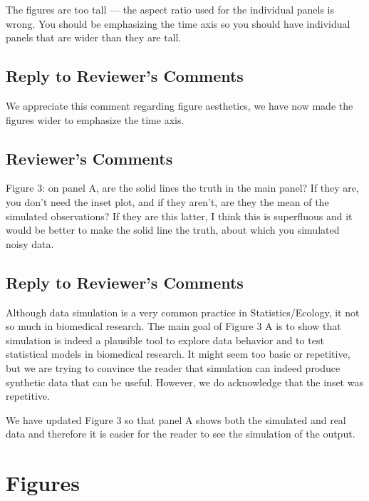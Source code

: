 \documentclass[
]{article}
\begin{document}
The figures are too tall --- the aspect ratio used for the individual panels is wrong. You should be emphasizing the time axis so you should have individual panels that are wider than they are tall.

\hypertarget{section-15}{%
\subsection{\texorpdfstring{\textcolor{reviewersblue} {Reply to Reviewer's Comments}}{}}\label{section-15}}

We appreciate this comment regarding figure aesthetics, we have now made the figures wider to emphasize the time axis.

\hypertarget{reviewers-comments-15}{%
\subsection{Reviewer's Comments}\label{reviewers-comments-15}}

Figure 3: on panel A, are the solid lines the truth in the main panel? If they are, you don't need the inset plot, and if they aren't, are they the mean of the simulated observations? If they are this latter, I think this is superfluous and it would be better to make the solid line the truth, about which you simulated noisy data.

\hypertarget{section-16}{%
\subsection{\texorpdfstring{\textcolor{reviewersblue} {Reply to Reviewer's Comments}}{}}\label{section-16}}

Although data simulation is a very common practice in Statistics/Ecology, it not so much in biomedical research. The main goal of Figure 3 A is to show that simulation is indeed a plausible tool to explore data behavior and to test statistical models in biomedical research. It might seem too basic or repetitive, but we are trying to convince the reader that simulation can indeed produce synthetic data that can be useful. However, we do acknowledge that the inset was repetitive.

We have updated Figure 3 so that panel A shows both the simulated and real data and therefore it is easier for the reader to see the simulation of the output.

\hypertarget{figures-1}{%
\section{Figures}\label{figures-1}}
\end{document}
